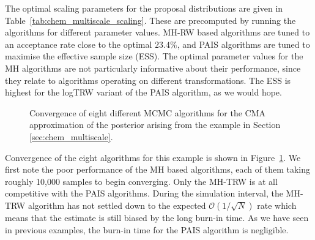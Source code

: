 \documentclass[final]{siamltex}
\begin{document}
The optimal scaling parameters for the proposal distributions are
given in Table~\ref{tab:chem_multiscale_scaling}. These are
precomputed by running the algorithms for different parameter
values. MH-RW based algorithms are tuned to an acceptance rate close
to the optimal $23.4\%$, and PAIS algorithms are tuned to maximise the
effective sample size (ESS). The optimal parameter values for the MH
algorithms are not particularly informative about their performance,
since they relate to algorithms operating on different
transformations. The ESS is highest for the logTRW variant
of the PAIS algorithm, as we would hope.

\begin{figure}[!htb]
\centering
{}
\caption{Convergence of eight different MCMC algorithms for the CMA
  approximation of the  posterior arising from the example in Section \ref{sec:chem_multiscale}.}
\label{fig:chem_multiscale_L2}
\end{figure}

Convergence of the eight algorithms for this example is shown in Figure~\ref{fig:chem_multiscale_L2}. We first note the poor performance of the MH based algorithms, each of them taking roughly 10,000 samples to begin converging. Only the MH-TRW is at all competitive with the PAIS algorithms. During the simulation interval, the MH-TRW algorithm has not settled down to the expected $\mathcal{O}(1/\sqrt{N})$ rate which means that the estimate is still biased by the long burn-in time. As we have seen in previous examples, the burn-in time for the PAIS algorithm is negligible.
\end{document}
